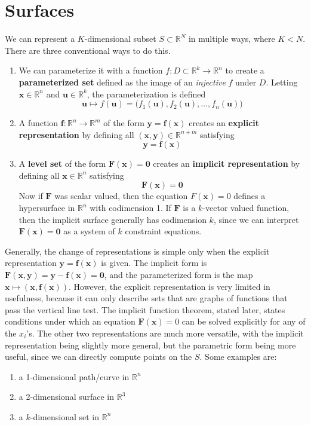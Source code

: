 \section{Surfaces}

  We can represent a $K$-dimensional subset $S \subset \mathbb{R}^N$ in multiple ways, where $K < N$. There are three conventional ways to do this. 
  \begin{enumerate}
      \item We can parameterize it with a function $f: D \subset \mathbb{R}^k \longrightarrow \mathbb{R}^n$ to create a \textbf{parameterized set} defined as the image of an \textit{injective} $f$ under $D$. Letting $\mathbf{x} \in \mathbb{R}^n$ and $\mathbf{u} \in \mathbb{R}^k$, the parameterization is defined 
      \[\mathbf{u} \mapsto f(\mathbf{u}) = \big( f_1 (\mathbf{u}), f_2 (\mathbf{u}), \ldots, f_n (\mathbf{u}) \big) \]
      
      \item A function $\mathbf{f}: \mathbb{R}^n \longrightarrow \mathbb{R}^m$ of the form $\mathbf{y} = \mathbf{f}(\mathbf{x})$ creates an \textbf{explicit representation} by defining all $(\mathbf{x}, \mathbf{y}) \in \mathbb{R}^{n+m}$ satisfying 
      \[\mathbf{y} = \mathbf{f}(\mathbf{x})\]
      
      \item A \textbf{level set} of the form $\mathbf{F}(\mathbf{x}) = \mathbf{0}$ creates an \textbf{implicit representation} by defining all $\mathbf{x} \in \mathbb{R}^n$ satisfying 
      \[\mathbf{F}(\mathbf{x}) = \mathbf{0}\]
      Now if $\mathbf{F}$ was scalar valued, then the equation $F(\mathbf{x}) = 0$ defines a hypersurface in $\mathbb{R}^n$ with codimension 1. If $\mathbf{F}$ is a $k$-vector valued function, then the implicit surface generally has codimension $k$, since we can interpret $\mathbf{F}(\mathbf{x}) = \mathbf{0}$ as a system of $k$ constraint equations. 
  \end{enumerate}
  Generally, the change of representations is simple only when the explicit representation $\mathbf{y} = \mathbf{f}(\mathbf{x})$ is given. The implicit form is $\mathbf{F}(\mathbf{x}, \mathbf{y}) = \mathbf{y} - \mathbf{f}(\mathbf{x}) = \mathbf{0}$, and the parameterized form is the map $\mathbf{x} \mapsto (\mathbf{x}, \mathbf{f}(\mathbf{x}))$. However, the explicit representation is very limited in usefulness, because it can only describe sets that are graphs of functions that pass the vertical line test. The implicit function theorem, stated later, states conditions under which an equation $\mathbf{F}(\mathbf{x}) = 0$ can be solved explicitly for any of the $x_i$'s. The other two representations are much more versatile, with the implicit representation being slightly more general, but the parametric form being more useful, since we can directly compute points on the $S$. Some examples are: 
  \begin{enumerate}
      \item a 1-dimensional path/curve in $\mathbb{R}^n$ 
      \item a 2-dimensional surface in $\mathbb{R}^3$ 
      \item a $k$-dimensional set in $\mathbb{R}^n$ 
  \end{enumerate}

